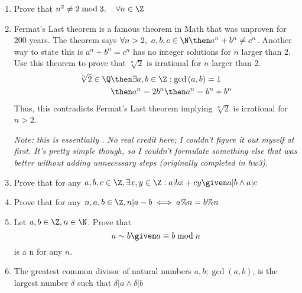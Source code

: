 \documentclass[basic, header]{nosvagor-notes}
\begin{document}
\begin{enumerate}[itemsep=10em]

  \item Prove that \(n^2 \neq 2 \bmod 3, \quad \forall n \in \Z \)

  \item Fermat’s Last theorem is a famous theorem in Math that was unproven for
    200 years. The theorem says \(\forall n > 2,~ a,b,c \in \N \then  a^n +
    b^n \neq c^n\). Another way to state this is \(a^n + b^n = c^n\) has no integer
    solutions for $n$ larger than 2. Use this theorem to prove that \(\sqrt[n]{2}\) is
    irrational for $n$ larger than 2.
    \begin{align*}
      \sqrt[n]{2} \in \Q &\then \exists a,b \in \Z : \gcd{(a,b)}=1 \\
                         &\then a^n = 2b^n \then a^n = b^n + b^n
    \end{align*}
    Thus, this contradicts Fermat's Last theorem implying \(\sqrt[n]{2}\) is
    irrational for \(n > 2\).

    \textit{Note: this is essentially
      . No real
      credit here; I couldn't figure it out myself at first. It's pretty simple
      though, so I couldn't formulate something else that was better without
      adding unnecessary steps (originally completed in hw3)}.

  \newpage %

    \item Prove that for any \(a,b,c \in \Z, \exists x,y \in \Z : a|bx+cy
      \given a|b \land a|c\)

    \item Prove that for any \( n,a,b \in \Z, n|a-b \iff a\%n = b\%n\)

  \newpage %

    \item Let \(a, b \in \Z, n \in \N\). Prove that \[a \sim b \given a \equiv
      b \bmod n\]
      is a n
      for any \(n\).

    \item The greatest common divisor of natural numbers \(a, b; \gcd(a,b) \),
      is the largest number \(\delta\) such that \(\delta|a \land \delta|b\)
      \begin{enumerate}


\end{enumerate}
\end{enumerate}
\end{document}
